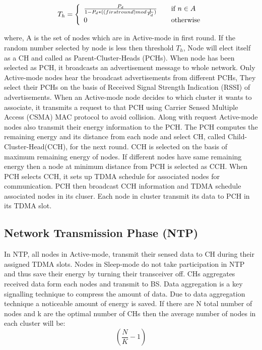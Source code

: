 \documentclass[journal]{IEEEtran}
\begin{document}
\begin{eqnarray}
 T_{h} = \left\{
  \begin{array}{l l}
    \frac {P_{d}}{1 - P_{d}*((firstround)mod\frac{1}{P_{d}})} & \quad \textrm{if $n \in A $ }\\
    0 & \quad \textrm{otherwise}\\
  \end{array} \right.
\end{eqnarray}

where, A is the set of nodes which are in Active-mode in first round. If the random number selected by node is less then threshold $T_{h}$, Node will elect itself as a CH and called as Parent-Cluster-Heads (PCHs). When node has been selected as PCH, it broadcasts an advertisement message to whole network. Only Active-mode nodes hear the broadcast advertisements from different PCHs, They select their PCHs on the basis of Received Signal Strength Indication (RSSI) of advertisements. When an Active-mode node decides to which cluster it wants to associate, it transmits a request to that PCH using Carrier Sensed Multiple Access (CSMA) MAC protocol to avoid collision. Along with request Active-mode nodes also transmit their energy information to the PCH. The PCH computes the remaining energy and its distance from each node and select CH, called Child-Cluster-Head(CCH), for the next round. CCH is selected on the basis of maximum remaining energy of nodes. If different nodes have same remaining energy then a node at minimum distance from PCH is selected as CCH. When PCH selects CCH, it sets up TDMA schedule for associated nodes for communication. PCH then broadcast CCH information and TDMA schedule associated nodes in its cluser. Each node in cluster transmit its data to PCH in its TDMA slot.

\subsection{Network Transmission Phase (NTP)}
In NTP, all nodes in Active-mode, transmit their sensed data to CH during their assigned TDMA slots. Nodes in Sleep-mode do not take participation in NTP and thus save their energy by turning their transceiver off. CHs aggregates received data form each nodes and transmit to BS. Data aggregation is a key signalling technique to compress the amount of data. Due to data aggregation technique a noticeable amount of energy is saved.
If there are N total number of nodes and k are the optimal number of CHs then the average number of nodes in each cluster will be:
\begin{equation}\label{2}
    \left(\frac{N}{K}-1 \right)
\end{equation}
\end{document}
